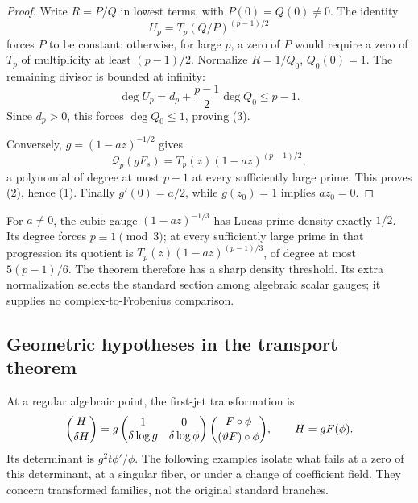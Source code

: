 \begin{proof}
Write $R=P/Q$ in lowest terms, with $P(0)=Q(0)\ne0$. The identity
\[
                     U_p=T_p(Q/P)^{(p-1)/2}
\]
forces $P$ to be constant: otherwise, for large $p$, a zero of $P$
would require a zero of $T_p$ of multiplicity at least $(p-1)/2$.
Normalize $R=1/Q_0$, $Q_0(0)=1$. The remaining divisor is bounded
at infinity:
\[
 \deg U_p=d_p+\frac{p-1}{2}\deg Q_0\le p-1.
\]
Since $d_p>0$, this forces $\deg Q_0\le1$, proving (3).

Conversely, $g=(1-az)^{-1/2}$ gives
\[
 \mathcal Q_p(gF_s)=T_p(z)(1-az)^{(p-1)/2},
\]
a polynomial of degree at most $p-1$ at every sufficiently large
prime. This proves (2), hence (1). Finally $g'(0)=a/2$, while
$g(z_0)=1$ implies $az_0=0$.
\end{proof}

\begin{remark}[Sharpness]\label{rem:C-algebraic-lucas-gauge}
For $a\ne0$, the cubic gauge $(1-az)^{-1/3}$ has Lucas-prime
density exactly $1/2$. Its degree forces $p\equiv1\pmod3$;
at every sufficiently large prime in that progression its quotient
is $T_p(z)(1-az)^{(p-1)/3}$, of degree at most $5(p-1)/6$.
The theorem therefore has a sharp density threshold. Its extra
normalization selects the standard section among algebraic scalar
gauges; it supplies no complex-to-Frobenius comparison.
\end{remark}

\subsection{Geometric hypotheses in the transport theorem}
\label{sec:countermodel-guardrails}
At a regular algebraic point, the first-jet transformation is
\begin{equation}\label{eq:countermodel-transport}
 \binom{H}{\delta H}
 =g\begin{pmatrix}1&0\\\delta\log g&\delta\log\phi\end{pmatrix}
       \binom{F\circ\phi}{(\vartheta F)\circ\phi},
 \qquad H=gF(\phi).
\end{equation}
Its determinant is $g^2t\phi'/\phi$. The following examples isolate
what fails at a zero of this determinant, at a singular fiber, or
under a change of coefficient field. They concern transformed
families, not the original standard branches.

